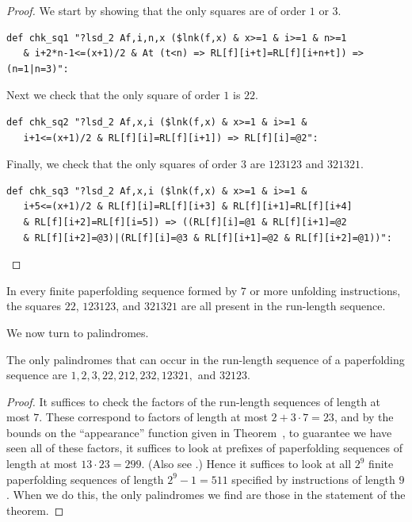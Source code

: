 \documentclass[12pt,reqno]{article}
\begin{document}
\begin{proof}
We start by showing that the only squares are of order $1$ or $3$.
\begin{verbatim}
def chk_sq1 "?lsd_2 Af,i,n,x ($lnk(f,x) & x>=1 & i>=1 & n>=1
   & i+2*n-1<=(x+1)/2 & At (t<n) => RL[f][i+t]=RL[f][i+n+t]) => (n=1|n=3)":
\end{verbatim}
Next we check that the only square of order $1$ is $22$.
\begin{verbatim}
def chk_sq2 "?lsd_2 Af,x,i ($lnk(f,x) & x>=1 & i>=1 &
   i+1<=(x+1)/2 & RL[f][i]=RL[f][i+1]) => RL[f][i]=@2":
\end{verbatim}
Finally, we check that the only squares of order $3$ are $123123$ and
$321321$.
\begin{verbatim}
def chk_sq3 "?lsd_2 Af,x,i ($lnk(f,x) & x>=1 & i>=1 & 
   i+5<=(x+1)/2 & RL[f][i]=RL[f][i+3] & RL[f][i+1]=RL[f][i+4]
   & RL[f][i+2]=RL[f][i=5]) => ((RL[f][i]=@1 & RL[f][i+1]=@2
   & RL[f][i+2]=@3)|(RL[f][i]=@3 & RL[f][i+1]=@2 & RL[f][i+2]=@1))":
\end{verbatim}
\end{proof}

\begin{proposition}
In every finite paperfolding sequence formed by $7$ or more unfolding
instructions, the squares $22$, $123123$, and $321321$ are all present in
the run-length sequence.
\end{proposition}

We now turn to palindromes.
\begin{theorem}
The only palindromes that can occur
in the run-length sequence of a paperfolding
sequence are $1,2,3, 22, 212, 232, 12321, $ and $32123$.
\end{theorem}

\begin{proof}
It suffices to check the factors of the run-length sequences of length
at most $7$.  These correspond to factors of length at most $2+3\cdot 7 = 23$,
and by the bounds on the ``appearance'' function given
in Theorem~\cite[Thm 12.2.2]{Shallit:2023}, to guarantee we have seen
all of these factors, it suffices to look at prefixes of paperfolding
sequences of length at most $13 \cdot 23 = 299$.
(Also see \cite{Burns:2022}.)
Hence it suffices
to look at all $2^9$ finite paperfolding sequences of length $2^9 - 1 = 511$
specified by instructions of length $9$.  When we do this, the only
palindromes we find are those in the statement of the theorem.
\end{proof}
\end{document}
